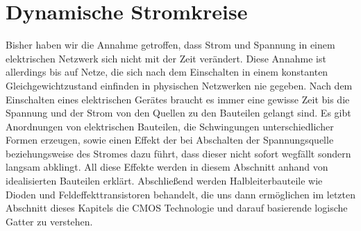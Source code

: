 \documentclass[11pt,a4paper,leqno]{report}
\numberwithin{equation}{chapter}
\begin{document}
\section{Dynamische Stromkreise}
Bisher haben wir die Annahme getroffen, dass Strom und Spannung in einem elektrischen Netzwerk sich nicht mit der Zeit ver\"andert. Diese Annahme ist allerdings bis auf Netze, die sich nach dem Einschalten in einem konstanten Gleichgewichtzustand einfinden in physischen Netzwerken nie gegeben. Nach dem Einschalten eines elektrischen Ger\"ates braucht es immer eine gewisse Zeit bis die Spannung und der Strom von den Quellen zu den Bauteilen gelangt sind. Es gibt Anordnungen von elektrischen Bauteilen, die Schwingungen unterschiedlicher Formen erzeugen, sowie einen Effekt der bei Abschalten der Spannungsquelle beziehungsweise des Stromes dazu f\"uhrt, dass dieser nicht sofort wegf\"allt sondern langsam abklingt. All diese Effekte werden in diesem Abschnitt anhand von idealisierten Bauteilen erkl\"art. Abschlie\ss{}end werden Halbleiterbauteile wie Dioden und Feldeffekttransistoren behandelt, die uns dann erm\"oglichen im letzten Abschnitt dieses Kapitels die CMOS Technologie und darauf basierende logische Gatter zu verstehen.
\end{document}
